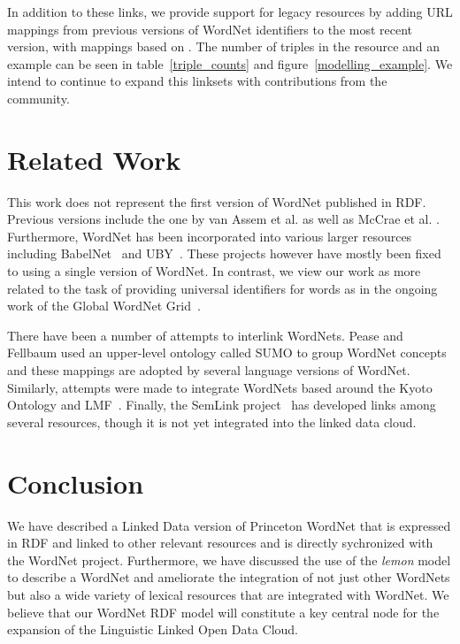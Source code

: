 \documentclass[10pt, a4paper]{article}
\newcommand{\lemon}[0]{\emph{lemon}}
\begin{document}
In addition to these links, we provide support for legacy resources by
adding URL mappings from previous versions of WordNet identifiers to the most
recent version, with mappings based on \cite{daude2000mapping}. The number of
triples in the resource and an example can be seen in table~\ref{triple_counts} and 
figure~\ref{modelling_example}. We intend to continue to expand this linksets
with contributions from the community.

\section{Related Work}

This work does not represent the first version of WordNet published in RDF. Previous versions
include the one by van Assem et al.  as well as McCrae et al. . Furthermore, WordNet has been
incorporated into various larger resources including
BabelNet~\cite{navigli2010babelnet,ehrmann2014} and 
UBY~\cite{gurevych2012uby,eckle2014lemonuby}. These projects however have mostly
been fixed to using a single version of WordNet. In contrast, we view our work
as more related to the task of providing universal identifiers for words as in the
ongoing work of the Global WordNet Grid~\cite{pease2008building}.  

There have been a number of attempts to interlink WordNets. 
Pease and Fellbaum  used an upper-level ontology called SUMO to group WordNet
concepts and these mappings are adopted by several language versions of WordNet.
Similarly, attempts were made to integrate WordNets based around the Kyoto
Ontology and LMF~\cite{soria2009wordnet}. Finally, the SemLink
project~\cite{palmer2009semlink} has
developed links among several resources, though it is not yet integrated into
the linked data cloud. 

\section{Conclusion}

We have described a Linked Data version of Princeton WordNet that is expressed in RDF and linked to other relevant resources and is directly sychronized with the WordNet project.
Furthermore, we have discussed
the use of the \lemon{} model to describe a WordNet and ameliorate the
integration of not just other WordNets but also a wide variety of lexical
resources that are integrated with WordNet. We believe that our WordNet RDF model 
will constitute a key central node for the expansion of the Linguistic
Linked Open Data Cloud.



\end{document}
